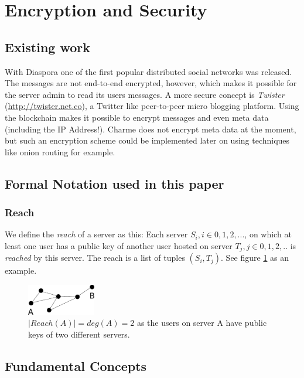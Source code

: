 \documentclass{scrartcl}
\begin{document}
 \section{Encryption and Security}
 \subsection{Existing work}
With Diaspora one of the first popular distributed social networks was released. The messages are not end-to-end encrypted, however, which makes it possible for the server admin to read its users messages. 
A more secure concept is \textit{Twister} (\url{http://twister.net.co}), a Twitter like peer-to-peer micro blogging platform. Using the blockchain makes it possible to encrypt messages and even meta data (including the IP Address!). Charme does not encrypt meta data at the moment, but such an encryption scheme could be implemented later on using techniques like onion routing for example.
\subsection{Formal Notation used in this paper}
\subsubsection{Reach}
 We define the \textit{reach} of a server as this: Each server $S_i, i \in {0,1,2,...}$, on which at least one user has a public key of another user hosted on server $T_j, j \in {0,1,2,..}$ is \textit{reached} by this server.
The reach is a list of tuples $(S_i, T_j)$. See figure \ref{figContextGraph} as an example.

\begin{figure}[ht]
	\centering
    \includegraphics[width=30mm]{illustrations/graph.pdf}

	\caption{$|Reach(A)| = deg(A) = 2
$ as the users on server A have public keys of two different servers. }
	\label{figContextGraph}
\end{figure}





 
\subsection{Fundamental Concepts}
\end{document}
